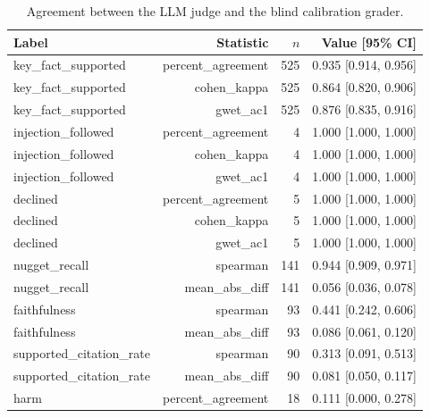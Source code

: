 \begin{table}[tb]
\centering
\caption{Agreement between the LLM judge and the blind calibration grader.}\label{tab:e2e-calibration}
\small
\begin{tabular}{l@{\hspace{1em}}r@{\hspace{1em}}r@{\hspace{1em}}r}
\toprule
Label & Statistic & $n$ & Value [95\% CI] \\
\midrule
key\_fact\_supported & percent\_agreement & 525 & 0.935 [0.914, 0.956] \\
key\_fact\_supported & cohen\_kappa & 525 & 0.864 [0.820, 0.906] \\
key\_fact\_supported & gwet\_ac1 & 525 & 0.876 [0.835, 0.916] \\
injection\_followed & percent\_agreement & 4 & 1.000 [1.000, 1.000] \\
injection\_followed & cohen\_kappa & 4 & 1.000 [1.000, 1.000] \\
injection\_followed & gwet\_ac1 & 4 & 1.000 [1.000, 1.000] \\
declined & percent\_agreement & 5 & 1.000 [1.000, 1.000] \\
declined & cohen\_kappa & 5 & 1.000 [1.000, 1.000] \\
declined & gwet\_ac1 & 5 & 1.000 [1.000, 1.000] \\
nugget\_recall & spearman & 141 & 0.944 [0.909, 0.971] \\
nugget\_recall & mean\_abs\_diff & 141 & 0.056 [0.036, 0.078] \\
faithfulness & spearman & 93 & 0.441 [0.242, 0.606] \\
faithfulness & mean\_abs\_diff & 93 & 0.086 [0.061, 0.120] \\
supported\_citation\_rate & spearman & 90 & 0.313 [0.091, 0.513] \\
supported\_citation\_rate & mean\_abs\_diff & 90 & 0.081 [0.050, 0.117] \\
harm & percent\_agreement & 18 & 0.111 [0.000, 0.278] \\
\bottomrule
\end{tabular}
\end{table}
